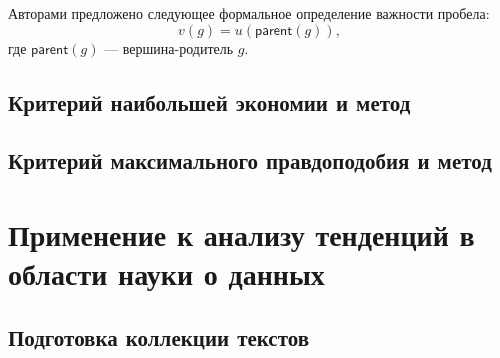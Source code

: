 \documentclass[12pt]{article}
\begin{document}
Авторами \cite{mirkin2018preprint} предложено следующее формальное определение важности пробела:
\begin{equation}
	v(g)=u(\textsf{parent}(g)),
\end{equation}
где $\textsf{parent}(g)$ --- вершина-родитель $g$.




\subsection{Критерий наибольшей экономии и метод}
\subsection{Критерий максимального правдоподобия и метод}


\section{Применение к анализу тенденций в области науки о данных}

\subsection{Подготовка коллекции текстов}
\label{section:text-data}
\end{document}
